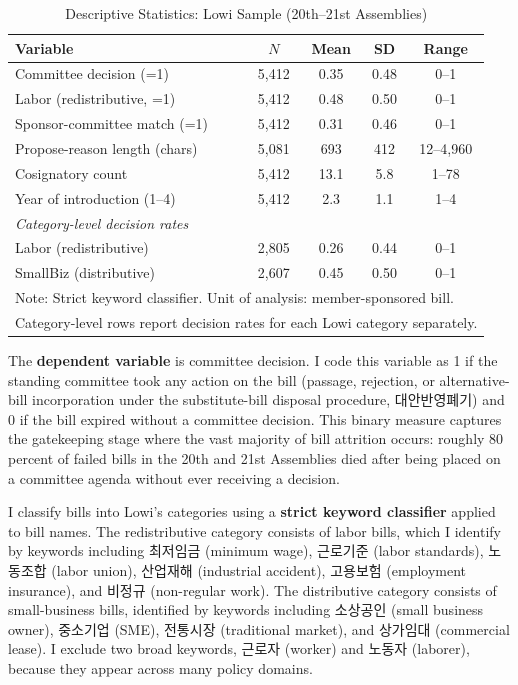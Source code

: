 \documentclass[11pt]{article}
\begin{document}
\begin{table}[H]
\centering
\caption{Descriptive Statistics: Lowi Sample (20th--21st Assemblies)}
\label{tab:desc}
\begin{tabular}{lcccc}
\toprule
Variable & $N$ & Mean & SD & Range \\
\midrule
Committee decision (=1) & 5,412 & 0.35 & 0.48 & 0--1 \\
Labor (redistributive, =1) & 5,412 & 0.48 & 0.50 & 0--1 \\
Sponsor-committee match (=1) & 5,412 & 0.31 & 0.46 & 0--1 \\
Propose-reason length (chars) & 5,081 & 693 & 412 & 12--4,960 \\
Cosignatory count & 5,412 & 13.1 & 5.8 & 1--78 \\
Year of introduction (1--4) & 5,412 & 2.3 & 1.1 & 1--4 \\
\midrule
\multicolumn{5}{l}{\textit{Category-level decision rates}} \\
\quad Labor (redistributive) & 2,805 & 0.26 & 0.44 & 0--1 \\
\quad SmallBiz (distributive) & 2,607 & 0.45 & 0.50 & 0--1 \\
\bottomrule
\multicolumn{5}{l}{\footnotesize Note: Strict keyword classifier. Unit of analysis: member-sponsored bill.} \\
\multicolumn{5}{l}{\footnotesize Category-level rows report decision rates for each Lowi category separately.} \\
\end{tabular}
\end{table}

The \textbf{dependent variable} is committee decision. I code this variable as 1 if the standing committee took any action on the bill (passage, rejection, or alternative-bill incorporation under the substitute-bill disposal procedure, 대안반영폐기) and 0 if the bill expired without a committee decision. This binary measure captures the gatekeeping stage where the vast majority of bill attrition occurs: roughly 80 percent of failed bills in the 20th and 21st Assemblies died after being placed on a committee agenda without ever receiving a decision.

I classify bills into Lowi's categories using a \textbf{strict keyword classifier} applied to bill names. The redistributive category consists of labor bills, which I identify by keywords including 최저임금 (minimum wage), 근로기준 (labor standards), 노동조합 (labor union), 산업재해 (industrial accident), 고용보험 (employment insurance), and 비정규 (non-regular work). The distributive category consists of small-business bills, identified by keywords including 소상공인 (small business owner), 중소기업 (SME), 전통시장 (traditional market), and 상가임대 (commercial lease). I exclude two broad keywords, 근로자 (worker) and 노동자 (laborer), because they appear across many policy domains.
\end{document}
